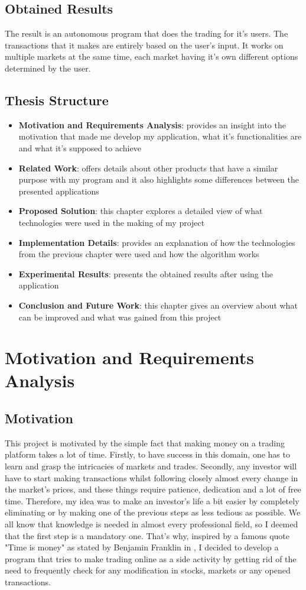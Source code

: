 \documentclass[12pt,a4paper]{report}
\begin{document}
\section{Obtained Results}
The result is an autonomous program that does the trading for it's users. The transactions that it makes are entirely based on the user's input. It works on multiple markets at the same time, each market having it's own different options determined by the user. 
\section{Thesis Structure}
\begin{itemize}
	\item \textbf{Motivation and Requirements Analysis}: provides an insight into the motivation that made me develop my application, what it's functionalities are and what it's supposed to achieve
	\item \textbf{Related Work}: offers details about other products that have a similar purpose with my program and it also highlights some differences between the presented applications
	\item \textbf{Proposed Solution}: this chapter explores a detailed view of what technologies were used in the making of my project
	\item \textbf{Implementation Details}: provides an explanation of how the technologies from the previous chapter were used and how the algorithm works
	\item \textbf{Experimental Results}: presents the obtained results after using the application
	\item \textbf{Conclusion and Future Work}: this chapter gives an overview about what can be improved and what was gained from this project
\end{itemize}


\chapter{Motivation and Requirements Analysis}
\section{Motivation}
This project is motivated by the simple fact that making money on a trading platform takes a lot of time. Firstly, to have success in this domain, one has to learn and grasp the intricacies of markets and trades. Secondly, any investor will have to start making transactions whilst following closely almost every change in the market's prices, and these things require patience, dedication and a lot of free time. Therefore, my idea was to make an investor's life a bit easier by completely eliminating or by making one of the previous steps as less tedious as possible. We all know that knowledge is needed in almost every professional field, so I deemed that the first step is a mandatory one. That's why, inspired by a famous quote "Time is money" as stated by Benjamin Franklin in \cite{timeIsMoney}, I decided to develop a program that tries to make trading online as a side activity by getting rid of the need to frequently check for any modification in stocks, markets or any opened transactions.
\end{document}
